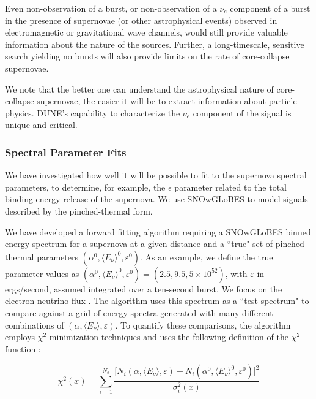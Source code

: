 Even non-observation of a burst, or non-observation of
a $\nu_e$ component of a burst in the presence of supernovae (or other
astrophysical events) observed in electromagnetic or gravitational
wave channels, would still provide valuable information about the
nature of the sources.  Further, a long-timescale, sensitive search
yielding no bursts will also provide limits on the rate of
core-collapse supernovae.

We note that the better one can understand the astrophysical nature of core-collapse supernovae, the easier it will be to extract information about particle physics.  DUNE's capability to characterize the $\nu_e$ component of the signal is unique and critical.

\subsubsection{Spectral Parameter Fits}


We have investigated how well it will be possible to fit to the supernova
spectral parameters, to determine, for example, the $\epsilon$
parameter related to the total binding energy release of the supernova.  We 
use SNOwGLoBES to model signals described by the pinched-thermal form.

We have developed a
forward fitting algorithm requiring a SNOwGLoBES binned energy
spectrum for a supernova at a given distance and a ``true" set of
pinched-thermal parameters $(\alpha^0, \langle E_\nu \rangle^0,
\varepsilon^0)$. As an example, we define the true parameter values as
$(\alpha^0, \langle E_\nu \rangle^0, \varepsilon^0) = (2.5, 9.5,
5\times 10^{52})$, with $\varepsilon$ in ergs/second, assumed
integrated over a ten-second burst.
We focus on the electron neutrino flux \cite{rosso}. The algorithm uses this spectrum as a ``test spectrum" to compare against a grid of energy spectra generated with many different combinations of $(\alpha, \langle E_\nu \rangle, \varepsilon)$. To quantify these comparisons, the algorithm employs $\chi^2$ minimization techniques and uses the following definition of the $\chi^2$ function \cite{ines}:

\begin{equation}
    \chi^2(x) = \sum_{i=1}^{N_b} \frac{\big[N_i(\alpha, \langle E_\nu \rangle, \varepsilon) - N_i(\alpha^0, \langle E_\nu \rangle^0, \varepsilon^0)\big]^2}{\sigma_i^2(x)}
    \label{chi2function}
\end{equation}

